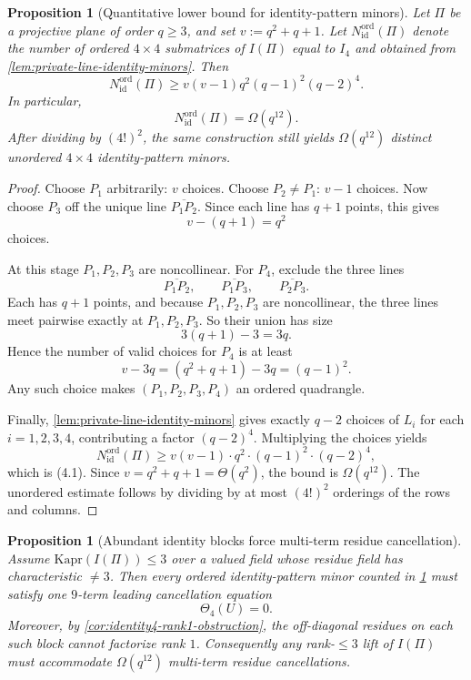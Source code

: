 \documentclass[11pt]{amsart}
\numberwithin{equation}{section}
\theoremstyle{plain}
\newtheorem{proposition}[theorem]{Proposition}
\theoremstyle{definition}
\theoremstyle{remark}
\newcommand{\Kapr}{\mathrm{Kapr}}
\begin{document}
\begin{proposition}[Quantitative lower bound for identity-pattern minors]
\label{prop:identity-minor-count-lower-bound}
Let $\Pi$ be a projective plane of order $q\ge 3$, and set $v:=q^2+q+1$.
Let $N_{\mathrm{id}}^{\mathrm{ord}}(\Pi)$ denote the number of ordered $4\times4$ submatrices of $I(\Pi)$ equal to $I_4$ and obtained from \cref{lem:private-line-identity-minors}.
Then
\[
N_{\mathrm{id}}^{\mathrm{ord}}(\Pi)\ge v(v-1)q^2(q-1)^2(q-2)^4.
\tag{4.1}
\]
In particular,
\[
N_{\mathrm{id}}^{\mathrm{ord}}(\Pi)=\Omega(q^{12}).
\]
After dividing by $(4!)^2$, the same construction still yields $\Omega(q^{12})$ distinct unordered $4\times4$ identity-pattern minors.
\end{proposition}

\begin{proof}
Choose $P_1$ arbitrarily: $v$ choices.
Choose $P_2\neq P_1$: $v-1$ choices.
Now choose $P_3$ off the unique line $\overline{P_1P_2}$.
Since each line has $q+1$ points, this gives
\[
v-(q+1)=q^2
\]
choices.

At this stage $P_1,P_2,P_3$ are noncollinear.
For $P_4$, exclude the three lines
\[
\overline{P_1P_2},\qquad \overline{P_1P_3},\qquad \overline{P_2P_3}.
\]
Each has $q+1$ points, and because $P_1,P_2,P_3$ are noncollinear, the three lines meet pairwise exactly at $P_1,P_2,P_3$.
So their union has size
\[
3(q+1)-3=3q.
\]
Hence the number of valid choices for $P_4$ is at least
\[
v-3q=(q^2+q+1)-3q=(q-1)^2.
\]
Any such choice makes $(P_1,P_2,P_3,P_4)$ an ordered quadrangle.

Finally, \cref{lem:private-line-identity-minors} gives exactly $q-2$ choices of $L_i$ for each $i=1,2,3,4$, contributing a factor $(q-2)^4$.
Multiplying the choices yields
\[
N_{\mathrm{id}}^{\mathrm{ord}}(\Pi)\ge v(v-1)\cdot q^2\cdot (q-1)^2\cdot (q-2)^4,
\]
which is \textup{(4.1)}.
Since $v=q^2+q+1=\Theta(q^2)$, the bound is $\Omega(q^{12})$.
The unordered estimate follows by dividing by at most $(4!)^2$ orderings of the rows and columns.
\end{proof}

\begin{proposition}[Abundant identity blocks force multi-term residue cancellation]
\label{prop:identity-minors-pressure}
Assume $\Kapr(I(\Pi))\le 3$ over a valued field whose residue field has characteristic $\neq 3$.
Then every ordered identity-pattern minor counted in \cref{prop:identity-minor-count-lower-bound} must satisfy one $9$-term leading cancellation equation
\[
\Theta_4(U)=0.
\]
Moreover, by \cref{cor:identity4-rank1-obstruction}, the off-diagonal residues on each such block cannot factorize rank $1$.
Consequently any rank-$\le 3$ lift of $I(\Pi)$ must accommodate $\Omega(q^{12})$ multi-term residue cancellations.
\end{proposition}
\end{document}
